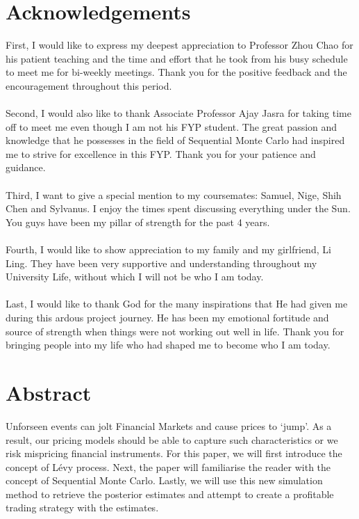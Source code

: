 \documentclass[12pt]{article}
\theoremstyle{definition}
\begin{document}
\section*{Acknowledgements}
\justify
First, I would like to express my deepest appreciation to Professor Zhou Chao for his patient teaching and the time and effort that he took from his busy schedule to meet me for bi-weekly meetings. Thank you for the positive feedback and the encouragement throughout this period. \\
\\
Second, I would also like to thank Associate Professor Ajay Jasra for taking time off to meet me even though I am not his FYP student. The great passion and knowledge that he possesses in the field of Sequential Monte Carlo had inspired me to strive for excellence in this FYP. Thank you for your patience and guidance.\\
\\
Third, I want to give a special mention to my coursemates: Samuel, Nige, Shih Chen and Sylvanus. I enjoy the times spent discussing everything under the Sun. You guys have been my pillar of strength for the past 4 years.\\
\\
Fourth, I would like to show appreciation to my family and my girlfriend, Li Ling. They have been very supportive and understanding throughout my University Life, without which I will not be who I am today.\\
\\
Last, I would like to thank God for the many inspirations that He had given me during this ardous project journey. He has been my emotional fortitude and source of strength when things were not working out well in life. Thank you for bringing people into my life who had shaped me to become who I am today.\\
\newpage
\section*{Abstract}
Unforseen events can jolt Financial Markets and cause prices to `jump'. As a result, our pricing models should be able to capture such characteristics or we risk mispricing financial instruments. For this paper, we will first introduce the concept of L\'evy process. Next, the paper will familiarise the reader with the concept of Sequential Monte Carlo. Lastly, we will use this new simulation method to retrieve the posterior estimates and attempt to create a profitable trading strategy with the estimates.
\newpage
\end{document}
